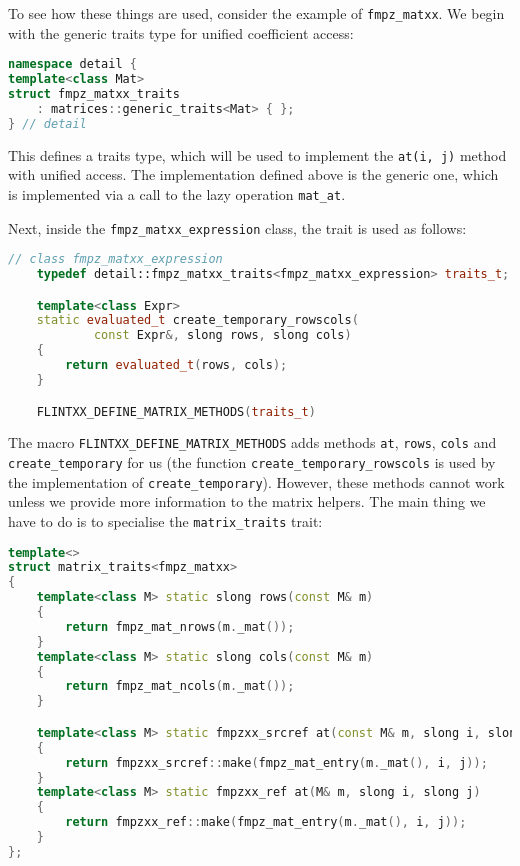 \documentclass[a4paper,10pt]{book}
\newcommand{\code}{\lstinline}
\begin{document}
{{To see how these things are used, consider the example of \code{fmpz_matxx}.
We begin with the generic traits type for unified coefficient access:

\begin{lstlisting}[language=c++]
namespace detail {
template<class Mat>
struct fmpz_matxx_traits
    : matrices::generic_traits<Mat> { };
} // detail
\end{lstlisting}

This defines a traits type, which will be used to implement the
\code{at(i, j)} method with unified access. The implementation defined above is
the generic one, which is implemented via a call to the lazy operation
\code{mat_at}.

Next, inside the
\code{fmpz_matxx_expression} class, the trait is used as follows:

\begin{lstlisting}[language=c++]
// class fmpz_matxx_expression
    typedef detail::fmpz_matxx_traits<fmpz_matxx_expression> traits_t;

    template<class Expr>
    static evaluated_t create_temporary_rowscols(
            const Expr&, slong rows, slong cols)
    {
        return evaluated_t(rows, cols);
    }

    FLINTXX_DEFINE_MATRIX_METHODS(traits_t)
\end{lstlisting}

The macro \code{FLINTXX_DEFINE_MATRIX_METHODS} adds methods \code{at},
\code{rows}, \code{cols} and \code{create_temporary} for us (the function
\code{create_temporary_rowscols} is used by the implementation of
\code{create_temporary}). However, these
methods cannot work unless we provide more information to the matrix helpers.
The main thing we have to do is to specialise the \code{matrix_traits} trait:

\begin{lstlisting}[language=c++]
template<>
struct matrix_traits<fmpz_matxx>
{
    template<class M> static slong rows(const M& m)
    {
        return fmpz_mat_nrows(m._mat());
    }
    template<class M> static slong cols(const M& m)
    {
        return fmpz_mat_ncols(m._mat());
    }

    template<class M> static fmpzxx_srcref at(const M& m, slong i, slong j)
    {
        return fmpzxx_srcref::make(fmpz_mat_entry(m._mat(), i, j));
    }
    template<class M> static fmpzxx_ref at(M& m, slong i, slong j)
    {
        return fmpzxx_ref::make(fmpz_mat_entry(m._mat(), i, j));
    }
};
\end{lstlisting}

}}
\end{document}
